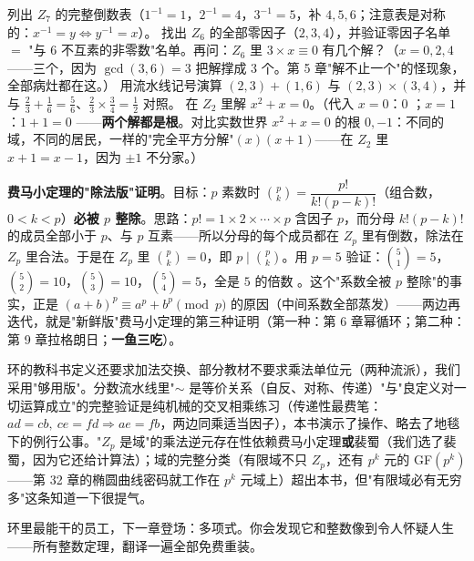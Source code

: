 \begin{dongshou}
\begin{itemize}
  \yisi 列出 $Z_7$ 的完整倒数表（$1^{-1}=1$，$2^{-1}=4$，$3^{-1}=5$，补 $4,5,6$；注意表是对称的：$x^{-1} = y \iff y^{-1} = x$）。
  \yier 找出 $Z_6$ 的全部零因子（$2, 3, 4$），并验证零因子名单 $=$ "与 $6$ 不互素的非零数"名单。再问：$Z_6$ 里 $3\times x \equiv 0$ 有几个解？（$x = 0, 2, 4$——三个，因为 $\gcd(3,6) = 3$ 把解撑成 $3$ 个。第 5 章"解不止一个"的怪现象，全部病灶都在这。）
  \yier 用流水线记号演算 $(2,3) + (1,6)$ 与 $(2,3)\times(3,4)$，并与 $\tfrac23+\tfrac16 = \tfrac56$、$\tfrac23\times\tfrac34 = \tfrac12$ 对照。
  \yisi 在 $Z_2$ 里解 $x^2 + x = 0$。（代入 $x=0$：$0$ \checkmark；$x=1$：$1+1 = 0$ \checkmark——\textbf{两个解都是根}。对比实数世界 $x^2+x=0$ 的根 $0, -1$：不同的域，不同的居民，一样的"完全平方分解"$(x)(x+1)$——在 $Z_2$ 里 $x+1 = x-1$，因为 $\pm1$ 不分家。）
\end{itemize}
\end{dongshou}

\begin{shaonao}
\textbf{费马小定理的"除法版"证明}。目标：$p$ 素数时 $\binom{p}{k} = \dfrac{p!}{k!(p-k)!}$（组合数，$0<k<p$）\textbf{必被 $p$ 整除}。思路：$p! = 1\times2\times\cdots\times p$ 含因子 $p$，而分母 $k!(p-k)!$ 的成员全部小于 $p$、与 $p$ 互素——所以分母的每个成员都在 $Z_p$ 里有倒数，除法在 $Z_p$ 里合法。于是在 $Z_p$ 里 $\binom pk = 0$，即 $p \mid \binom pk$。用 $p = 5$ 验证：$\binom51 = 5$，$\binom52 = 10$，$\binom53 = 10$，$\binom54 = 5$，全是 $5$ 的倍数 \checkmark。这个"系数全被 $p$ 整除"的事实，正是 $(a+b)^p \equiv a^p + b^p \pmod p$ 的原因（中间系数全部蒸发）——两边再迭代，就是"新鲜版"费马小定理的第三种证明（第一种：第 6 章幂循环；第二种：第 9 章拉格朗日；\textbf{一鱼三吃}）。
\end{shaonao}

\begin{chengshi}
环的教科书定义还要求加法交换、部分教材不要求乘法单位元（两种流派），我们采用"够用版"。分数流水线里"$\sim$ 是等价关系（自反、对称、传递）"与"良定义对一切运算成立"的完整验证是纯机械的交叉相乘练习（传递性最费笔：$ad=cb,\ ce=fd \Rightarrow ae = fb$，两边同乘适当因子），本书演示了操作、略去了地毯下的例行公事。"$Z_p$ 是域"的乘法逆元存在性依赖费马小定理\textbf{或}裴蜀（我们选了裴蜀，因为它还给计算法）；域的完整分类（有限域不只 $Z_p$，还有 $p^k$ 元的 GF$(p^k)$——第 32 章的椭圆曲线密码就工作在 $p^k$ 元域上）超出本书，但"有限域必有无穷多"这条知道一下很提气。
\end{chengshi}

环里最能干的员工，下一章登场：多项式。你会发现它和整数像到令人怀疑人生——所有整数定理，翻译一遍全部免费重装。
